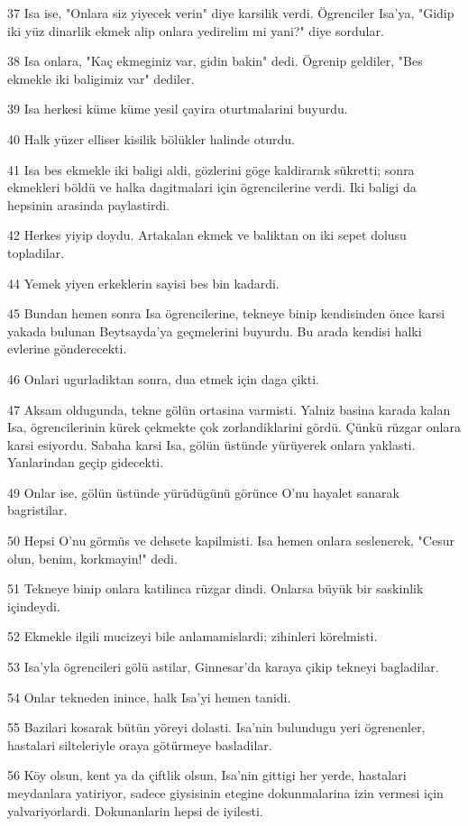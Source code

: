 \par 37 Isa ise, "Onlara siz yiyecek verin" diye karsilik verdi. Ögrenciler Isa'ya, "Gidip iki yüz dinarlik ekmek alip onlara yedirelim mi yani?" diye sordular.
\par 38 Isa onlara, "Kaç ekmeginiz var, gidin bakin" dedi. Ögrenip geldiler, "Bes ekmekle iki baligimiz var" dediler.
\par 39 Isa herkesi küme küme yesil çayira oturtmalarini buyurdu.
\par 40 Halk yüzer elliser kisilik bölükler halinde oturdu.
\par 41 Isa bes ekmekle iki baligi aldi, gözlerini göge kaldirarak sükretti; sonra ekmekleri böldü ve halka dagitmalari için ögrencilerine verdi. Iki baligi da hepsinin arasinda paylastirdi.
\par 42 Herkes yiyip doydu. Artakalan ekmek ve baliktan on iki sepet dolusu topladilar.
\par 44 Yemek yiyen erkeklerin sayisi bes bin kadardi.
\par 45 Bundan hemen sonra Isa ögrencilerine, tekneye binip kendisinden önce karsi yakada bulunan Beytsayda'ya geçmelerini buyurdu. Bu arada kendisi halki evlerine gönderecekti.
\par 46 Onlari ugurladiktan sonra, dua etmek için daga çikti.
\par 47 Aksam oldugunda, tekne gölün ortasina varmisti. Yalniz basina karada kalan Isa, ögrencilerinin kürek çekmekte çok zorlandiklarini gördü. Çünkü rüzgar onlara karsi esiyordu. Sabaha karsi Isa, gölün üstünde yürüyerek onlara yaklasti. Yanlarindan geçip gidecekti.
\par 49 Onlar ise, gölün üstünde yürüdügünü görünce O'nu hayalet sanarak bagristilar.
\par 50 Hepsi O'nu görmüs ve dehsete kapilmisti. Isa hemen onlara seslenerek, "Cesur olun, benim, korkmayin!" dedi.
\par 51 Tekneye binip onlara katilinca rüzgar dindi. Onlarsa büyük bir saskinlik içindeydi.
\par 52 Ekmekle ilgili mucizeyi bile anlamamislardi; zihinleri körelmisti.
\par 53 Isa'yla ögrencileri gölü astilar, Ginnesar'da karaya çikip tekneyi bagladilar.
\par 54 Onlar tekneden inince, halk Isa'yi hemen tanidi.
\par 55 Bazilari kosarak bütün yöreyi dolasti. Isa'nin bulundugu yeri ögrenenler, hastalari silteleriyle oraya götürmeye basladilar.
\par 56 Köy olsun, kent ya da çiftlik olsun, Isa'nin gittigi her yerde, hastalari meydanlara yatiriyor, sadece giysisinin etegine dokunmalarina izin vermesi için yalvariyorlardi. Dokunanlarin hepsi de iyilesti.

